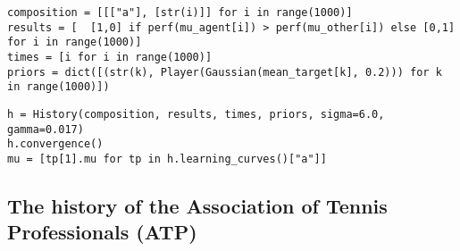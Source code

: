 \documentclass[article]{jss}
\newif\ifen
\newif\ifes
\newcommand{\en}[1]{\ifen#1\fi}
\newcommand{\es}[1]{\ifes#1\fi}
\begin{document}
\begin{lstlisting}[backgroundcolor=\color{python}]
composition = [[["a"], [str(i)]] for i in range(1000)]
results = [  [1,0] if perf(mu_agent[i]) > perf(mu_other[i]) else [0,1] for i in range(1000)]
times = [i for i in range(1000)]
priors = dict([(str(k), Player(Gaussian(mean_target[k], 0.2))) for k in range(1000)])
\end{lstlisting}

\begin{lstlisting}[backgroundcolor=\color{python}]
h = History(composition, results, times, priors, sigma=6.0, gamma=0.017)
h.convergence()
mu = [tp[1].mu for tp in h.learning_curves()["a"]] 
\end{lstlisting}







\subsection{The history of the Association of Tennis Professionals (ATP)}

% 

%
%
%
%
\end{document}
